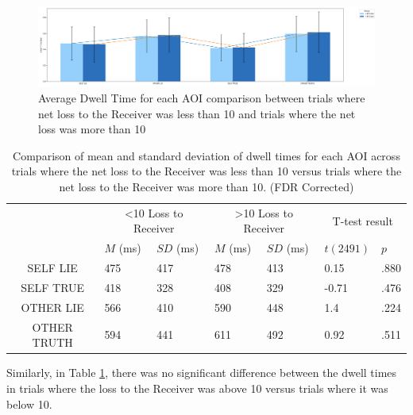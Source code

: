\documentclass[man, floatsintext]{apa7}
\begin{document}
\begin{figure}[H]
	\centering
	\includegraphics[width=\linewidth]{../plots/RESPONSE/AvgDwellPerLossPlot.png}
	\caption{Average Dwell Time for each AOI comparison between trials where net loss to the Receiver was less than 10 and trials where the net loss was more than 10}
	\label{fig:AvgDwellPerLoss}
\end{figure}

\begin{table}[H]
	\centering
	\begin{tabular}{|c|p{1.5cm}|p{2cm}|p{1.5cm}|p{2cm}|p{2cm}|p{1.5cm}|}
		\hline
		\multirow{2}{*}{} & \multicolumn{2}{c|}{<10 Loss to Receiver} & \multicolumn{2}{c|}{>10 Loss to Receiver} & \multicolumn{2}{c|}{T-test result} \\ \cline{2-7}
		& $M$ (ms) &$SD$ (ms) & $M$ (ms) & $SD$ (ms) & $t(2491)$ & $p$ \\ \hline
		SELF LIE& 475 & 417 & 478 & 413 & 0.15 & .880  \\ \hline
		SELF TRUE & 418 & 328 & 408 & 329 & -0.71 & .476  \\ \hline
		OTHER LIE & 566 & 410 & 590 & 448 & 1.4 & .224 \\ \hline
		OTHER TRUTH & 594 & 441 & 611 & 492 & 0.92 & .511 \\ \hline
	\end{tabular}
	\vspace{0.3cm}
	\caption{Comparison of mean and standard deviation of dwell times for each AOI across trials where the net loss to the Receiver was less than 10 versus trials where the net loss to the Receiver was more than 10. (FDR Corrected)}
	\label{tab:NetLossDwell}
\end{table}

Similarly, in Table \ref{tab:NetLossDwell}, there was no significant difference between the dwell times in trials where the loss to the Receiver was above 10 versus trials where it was below 10.
\end{document}
